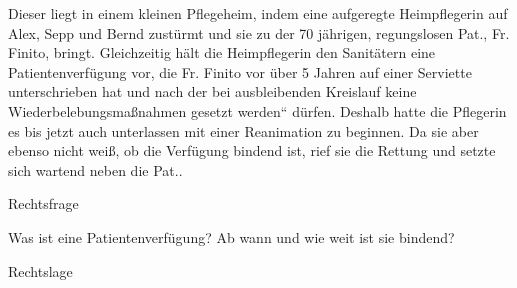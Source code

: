 \documentclass{article}
\begin{document}
Dieser liegt in einem kleinen Pflegeheim, indem eine aufgeregte
Heimpflegerin auf Alex, Sepp und Bernd zust\"urmt und sie zu der 70
j\"ahrigen, regungslosen Pat., Fr. Finito, bringt. Gleichzeitig h\"alt
die Heimpflegerin den Sanit\"atern eine Patientenverf\"ugung vor, die
Fr. Finito vor \"uber 5 Jahren auf einer Serviette unterschrieben hat
und nach der {\quotedblbase}bei ausbleibenden Kreislauf keine
Wiederbelebungsma{\ss}nahmen gesetzt werden{\textquotedblleft}
d\"urfen. Deshalb hatte die Pflegerin es bis jetzt auch unterlassen mit
einer Reanimation zu beginnen. Da sie aber ebenso nicht wei{\ss}, ob
die Verf\"ugung bindend ist, rief sie die Rettung und setzte sich
wartend neben die Pat..

Rechtsfrage

Was ist eine Patientenverf\"ugung? Ab wann und wie weit ist sie bindend?

Rechtslage
\end{document}
